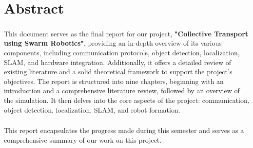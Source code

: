 \chapter*{Abstract}
\paragraph*{}This document serves as the final report for our project, \textbf{"Collective Transport using Swarm Robotics"}, providing an in-depth overview of its various components, including communication protocols, object detection, localization, SLAM, and hardware integration. Additionally, it offers a detailed review of existing literature and a solid theoretical framework to support the project's objectives. The report is structured into nine chapters, beginning with an introduction and a comprehensive literature review, followed by an overview of the simulation. It then delves into the core aspects of the project: communication, object detection, localization, SLAM, and robot formation.

\paragraph*{}This report encapsulates the progress made during this semester and serves as a comprehensive summary of our work on this project.